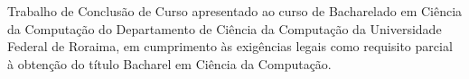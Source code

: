 \begin{titlepage}
    \begin{center}
        {\bfseries\LARGE 
            \makeatletter
            \@title
            \makeatother
        }\\[4cm]

        {\Large 
            \makeatletter
            \@author
            \makeatother
        }\\[4cm]

        \begin{flushright}
            \parbox{9cm}{\setlength{\parindent}{0pt}
            Trabalho de Conclusão de Curso apresentado ao curso de Bacharelado em Ciência da Computação do Departamento de Ciência da Computação da Universidade Federal de Roraima, em cumprimento às exigências legais como requisito parcial à obtenção do título Bacharel em Ciência da Computação.
            }
        \end{flushright}


\end{center}
\end{titlepage}
